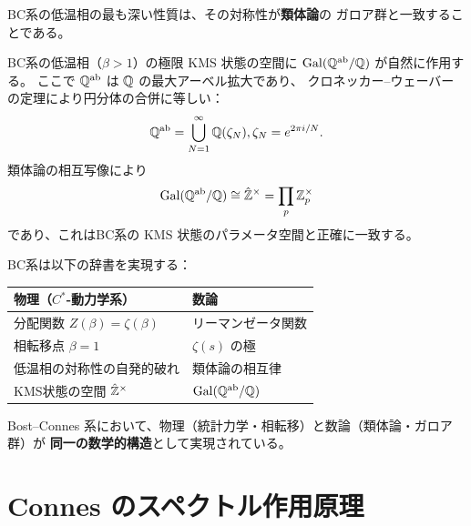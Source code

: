 BC系の低温相の最も深い性質は、その対称性が\textbf{類体論}の
ガロア群と一致することである。

\begin{theorem}[BC系のガロア対称性]
\label{thm:BC-galois}
BC系の低温相（$\beta > 1$）の極限 KMS 状態の空間に
$\operatorname{Gal}(\mathbb{Q}^{\mathrm{ab}}/\mathbb{Q})$ が自然に作用する。
ここで $\mathbb{Q}^{\mathrm{ab}}$ は $\mathbb{Q}$ の最大アーベル拡大であり、
クロネッカー--ウェーバーの定理により円分体の合併に等しい：
\begin{equation}
  \mathbb{Q}^{\mathrm{ab}} = \bigcup_{N=1}^{\infty} \mathbb{Q}(\zeta_N), 
  \zeta_N = e^{2\pi i/N}.
\end{equation}
類体論の相互写像により
\begin{equation}
  \operatorname{Gal}(\mathbb{Q}^{\mathrm{ab}}/\mathbb{Q}) \cong \hat{\mathbb{Z}}^{\times}
  = \prod_{p} \mathbb{Z}_p^{\times}
\end{equation}
であり、これはBC系の KMS 状態のパラメータ空間と正確に一致する。
\end{theorem}

\begin{keyresult}[数論と物理の接続点]
BC系は以下の辞書を実現する：

\begin{center}
\renewcommand{\arraystretch}{1.3}
\begin{tabular}{ll}
\toprule
\textbf{物理}（$C^*$-動力学系） & \textbf{数論} \\
\midrule
分配関数 $Z(\beta) = \zeta(\beta)$ & リーマンゼータ関数 \\
相転移点 $\beta = 1$ & $\zeta(s)$ の極 \\
低温相の対称性の自発的破れ & 類体論の相互律 \\
KMS状態の空間 $\hat{\mathbb{Z}}^{\times}$ & $\operatorname{Gal}(\mathbb{Q}^{\mathrm{ab}}/\mathbb{Q})$ \\
\bottomrule
\end{tabular}
\end{center}

\medskip
\noindent
Bost--Connes 系において、物理（統計力学・相転移）と数論（類体論・ガロア群）が
\textbf{同一の数学的構造}として実現されている。
\end{keyresult}


\section{Connes のスペクトル作用原理}
\label{sec:spectral-action}

